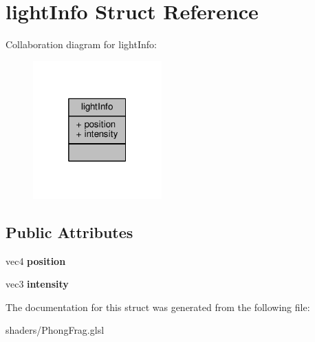 \hypertarget{structlight_info}{\section{light\-Info Struct Reference}
\label{structlight_info}
}


Collaboration diagram for light\-Info\-:
\nopagebreak
\begin{figure}[H]
\begin{center}
\leavevmode
\includegraphics[width=140pt]{structlight_info__coll__graph}
\end{center}
\end{figure}
\subsection*{Public Attributes}
\begin{DoxyCompactItemize}
\item 
\hypertarget{structlight_info_a91464db499bb017224ed4137db3ad357}{vec4 {\bfseries position}}\label{structlight_info_a91464db499bb017224ed4137db3ad357}

\item 
\hypertarget{structlight_info_a0a3a282dd8998aed665222fd1902611f}{vec3 {\bfseries intensity}}\label{structlight_info_a0a3a282dd8998aed665222fd1902611f}

\end{DoxyCompactItemize}


The documentation for this struct was generated from the following file\-:\begin{DoxyCompactItemize}
\item 
shaders/Phong\-Frag.\-glsl\end{DoxyCompactItemize}
